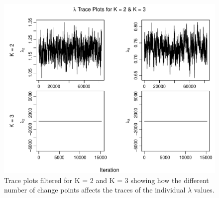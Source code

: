 \documentclass[11pt,a4paper]{article}
\numberwithin{equation}{section}
\begin{document}
\begin{figure}

{\centering \includegraphics[height=0.41\textheight]{thesis_draft_files/figure-latex/unnamed-chunk-6-1} 

}

\caption{Trace plots filtered for K = 2 and K = 3 showing how the different number of change points affects the traces of the individual $\lambda$ values.}\label{fig:unnamed-chunk-6}
\end{figure}
\end{document}
